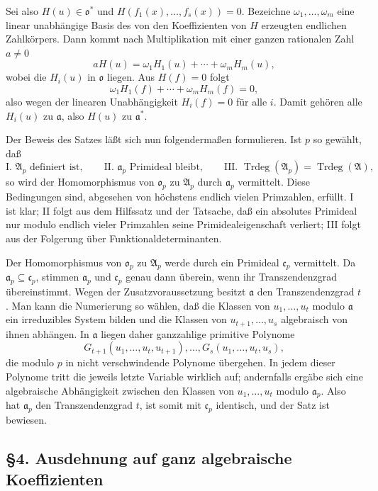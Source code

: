 \documentclass[11pt]{article}
\providecommand{\frakA}{\mathfrak A}
\providecommand{\frako}{\mathfrak o}
\providecommand{\fraka}{\mathfrak a}
\providecommand{\frakc}{\mathfrak c}
\providecommand{\Trdeg}{\operatorname{Trdeg}}
\begin{document}
Sei also \(H(u)\in\frako^*\) und \(H(f_1(x),\ldots,f_s(x))=0\). Bezeichne \(\omega_1,\ldots,\omega_m\) eine linear unabhängige Basis des von den Koeffizienten von \(H\) erzeugten endlichen Zahlkörpers. Dann kommt nach Multiplikation mit einer ganzen rationalen Zahl \(a\ne0\)
\[
        aH(u)=\omega_1H_1(u)+\cdots+\omega_mH_m(u),
\]
wobei die \(H_i(u)\) in \(\frako\) liegen. Aus \(H(f)=0\) folgt
\[
        \omega_1H_1(f)+\cdots+\omega_mH_m(f)=0,
\]
also wegen der linearen Unabhängigkeit \(H_i(f)=0\) für alle \(i\). Damit gehören alle \(H_i(u)\) zu \(\fraka\), also \(H(u)\) zu \(\fraka^*\).

Der Beweis des Satzes läßt sich nun folgendermaßen formulieren. Ist \(p\) so gewählt, daß
\[
\text{I. }\frakA_p\text{ definiert ist},\qquad
\text{II. }\fraka_p\text{ Primideal bleibt},\qquad
\text{III. }\Trdeg(\frakA_p)=\Trdeg(\frakA),
\]
so wird der Homomorphismus von \(\frako_p\) zu \(\frakA_p\) durch \(\fraka_p\) vermittelt. Diese Bedingungen sind, abgesehen von höchstens endlich vielen Primzahlen, erfüllt. I ist klar; II folgt aus dem Hilfssatz und der Tatsache, daß ein absolutes Primideal nur modulo endlich vieler Primzahlen seine Primidealeigenschaft verliert; III folgt aus der Folgerung über Funktionaldeterminanten.

Der Homomorphismus von \(\frako_p\) zu \(\frakA_p\) werde durch ein Primideal \(\frakc_p\) vermittelt. Da \(\fraka_p\subseteq\frakc_p\), stimmen \(\fraka_p\) und \(\frakc_p\) genau dann überein, wenn ihr Transzendenzgrad übereinstimmt. Wegen der Zusatzvoraussetzung besitzt \(\fraka\) den Transzendenzgrad \(t\). Man kann die Numerierung so wählen, daß die Klassen von \(u_1,\ldots,u_t\) modulo \(\fraka\) ein irreduzibles System bilden und die Klassen von \(u_{t+1},\ldots,u_s\) algebraisch von ihnen abhängen. In \(\fraka\) liegen daher ganzzahlige primitive Polynome
\[
        G_{t+1}(u_1,\ldots,u_t,u_{t+1}),\ldots,
        G_s(u_1,\ldots,u_t,u_s),
\]
die modulo \(p\) in nicht verschwindende Polynome übergehen. In jedem dieser Polynome tritt die jeweils letzte Variable wirklich auf; andernfalls ergäbe sich eine algebraische Abhängigkeit zwischen den Klassen von \(u_1,\ldots,u_t\) modulo \(\fraka_p\). Also hat \(\fraka_p\) den Transzendenzgrad \(t\), ist somit mit \(\frakc_p\) identisch, und der Satz ist bewiesen.

\subsection*{§4. Ausdehnung auf ganz algebraische Koeffizienten}
\end{document}
